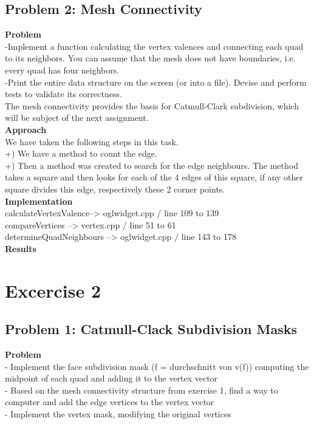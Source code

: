 \documentclass[12pt,a4paper]{scrartcl}
\begin{document}
\subsection{Problem 2: Mesh Connectivity}

\large
\textbf{Problem}\\
-Implement a function calculating the vertex valences and connecting each quad to its neighbors.
You can assume that the mesh does not have boundaries, i.e. every quad has four neighbors.\\
-Print the entire data structure on the screen (or into a file). Devise and perform tests to validate
its correctness.\\
The mesh connectivity provides the basis for Catmull-Clark subdivision, which will be subject of the
next assignment.\\[0,5cm]

\textbf{Approach}\\
We have taken the following steps in this task.\\
+) We have a method to count the edge.\\
+) Then a method was created to search for the edge neighbours. The method takes a square and then looks for each of the 4 edges of this square, if any other square divides this edge, respectively these 2 corner points.\\[0,5cm]

\textbf{Implementation}\\
calculateVertexValence--> oglwidget.cpp / line 109 to 139\\
compareVertices --> vertex.cpp / line 51 to 61\\
determineQuadNeighbours --> oglwidget.cpp / line 143 to 178\\[0,5cm]

\textbf{Results}\\


\newpage

\section{Excercise 2}

\subsection{Problem 1: Catmull-Clack Subdivision Masks}

\large
\textbf{Problem}\\
- Implement the face subdivision mask (f = durchschnitt von v(f)) computing the midpoint of each quad and adding it to the vertex vector\\
- Based on the mesh connectivity structure from exercise 1, find a way to computer and add the edge vertices to the vertex vector\\
- Implement the vertex mask, modifying the original vertices\\
 
\end{document}
